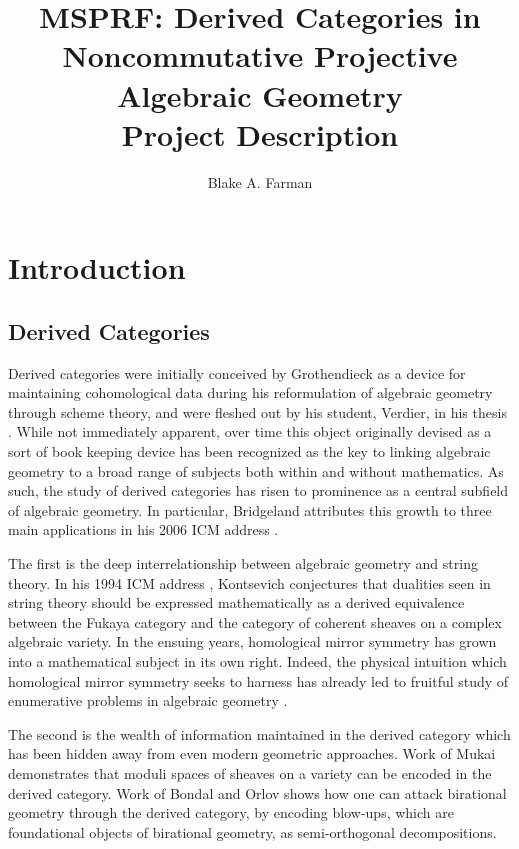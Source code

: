 \documentclass[11pt]{article}
\title{MSPRF: Derived Categories in Noncommutative Projective Algebraic Geometry\\\small{Project Description}}
\author{Blake A. Farman}
\date{}
\begin{document}
\maketitle

\section{Introduction}
\subsection{Derived Categories}
Derived categories were initially conceived by Grothendieck as a device for maintaining cohomological data during his reformulation of algebraic geometry through scheme theory, and were fleshed out by his student, Verdier, in his thesis \cite{Verdier}.
While not immediately apparent, over time this object originally devised as a sort of book keeping device has been recognized as the key to linking algebraic geometry to a broad range of subjects both within and without mathematics.
As such, the study of derived categories has risen to prominence as a central subfield of algebraic geometry.
In particular, Bridgeland attributes this growth to three main applications in his 2006 ICM address \cite{Bridgeland06}.

The first is the deep interrelationship between algebraic geometry and string theory.
In his 1994 ICM address \cite{Kontsevich}, Kontsevich conjectures that dualities seen in string theory should be expressed mathematically as a derived equivalence between the Fukaya category and the category of coherent sheaves on a complex algebraic variety.
In the ensuing years, homological mirror symmetry has grown into a mathematical subject in its own right.
Indeed, the physical intuition which homological mirror symmetry seeks to harness has already led to fruitful study of enumerative problems in algebraic geometry \cite{enumerative}.

The second is the wealth of information maintained in the derived category which has been hidden away from even modern geometric approaches.
Work of Mukai \cite{Mukai81,Mukai87} demonstrates that moduli spaces of sheaves on a variety can be encoded in the derived category.
Work of Bondal and Orlov \cite{Bondal-Orlov} shows how one can attack birational geometry through the derived category, by encoding blow-ups, which are foundational objects of birational geometry, as semi-orthogonal decompositions.
\end{document}
